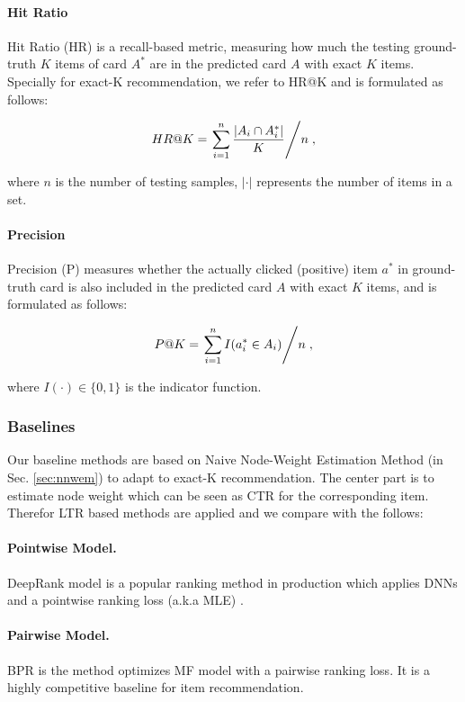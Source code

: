 \paragraph{\textbf{Hit Ratio}} 
Hit Ratio (HR) is a recall-based metric, measuring how much the
testing ground-truth $K$ items of card $A^*$ are in the predicted card $A$ with exact $K$ items.
Specially for exact-K recommendation, we refer to HR@K and is formulated as follows:
\begin{small}
\begin{equation}
HR@K = \left.\sum_{i=1}^{n}{\frac{|A_i\cap A_i^*|}{K}}\middle/n\right.,
\end{equation}
\end{small}
where $n$ is the number of testing samples,
$|\cdot|$ represents the number of items in a set.

\paragraph{\textbf{Precision}}
Precision (P) measures whether the actually clicked (positive) item $a^*$ in ground-truth card is also included in the predicted card $A$ with exact $K$ items,
and is formulated as follows:
\begin{small}
\begin{equation}
P@K = \left.\sum_{i=1}^{n}{I(a_i^*\in A_i)}\middle/n\right.,
\end{equation}
\end{small}
where $I(\cdot)\in\{0,1\}$ is the indicator function. 

\subsubsection{Baselines}
Our baseline methods are based on Naive Node-Weight Estimation Method (in Sec. \ref{sec:nnwem}) to adapt to exact-K recommendation.
The center part is to estimate node weight which can be seen as CTR for the corresponding item.
Therefor LTR based methods are applied and we compare with the follows:
\paragraph{\textbf{Pointwise Model.}}
DeepRank model is a popular ranking method in production which applies DNNs and a pointwise ranking loss (a.k.a MLE) \cite{he2017neural}.

\paragraph{\textbf{Pairwise Model.}}
BPR \cite{rendle2009bpr} is the method optimizes MF model \cite{koren2009matrix} with a pairwise ranking loss. It is a highly competitive
baseline for item recommendation.

